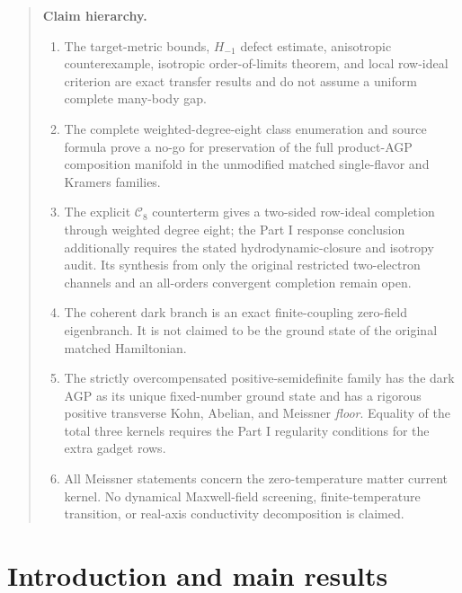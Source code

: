 \documentclass[11pt]{article}
\theoremstyle{definition}
\theoremstyle{remark}
\newcommand{\cC}{\mathcal C}
\begin{document}
\begin{quote}\small
\textbf{Claim hierarchy.}
\begin{enumerate}
\item The target-metric bounds, $H_{-1}$ defect estimate, anisotropic
counterexample, isotropic order-of-limits theorem, and local row-ideal criterion
are exact transfer results and do not assume a uniform complete many-body gap.
\item The complete weighted-degree-eight class enumeration and source formula
prove a no-go for preservation of the full product-AGP composition manifold in
the unmodified matched single-flavor and Kramers families.
\item The explicit $\cC_8$ counterterm gives a two-sided row-ideal completion
through weighted degree eight; the Part I response conclusion additionally
requires the stated hydrodynamic-closure and isotropy audit.  Its synthesis from only the original restricted
two-electron channels and an all-orders convergent completion remain open.
\item The coherent dark branch is an exact finite-coupling zero-field
eigenbranch.  It is not claimed to be the ground state of the original matched
Hamiltonian.
\item The strictly overcompensated positive-semidefinite family has the dark AGP
as its unique fixed-number ground state and has a rigorous positive transverse
Kohn, Abelian, and Meissner \emph{floor}.  Equality of the total three kernels
requires the Part I regularity conditions for the extra gadget rows.
\item All Meissner statements concern the zero-temperature matter current
kernel.  No dynamical Maxwell-field screening, finite-temperature transition,
or real-axis conductivity decomposition is claimed.
\end{enumerate}
\end{quote}

\section{Introduction and main results}
\label{sec:intro}
\end{document}

